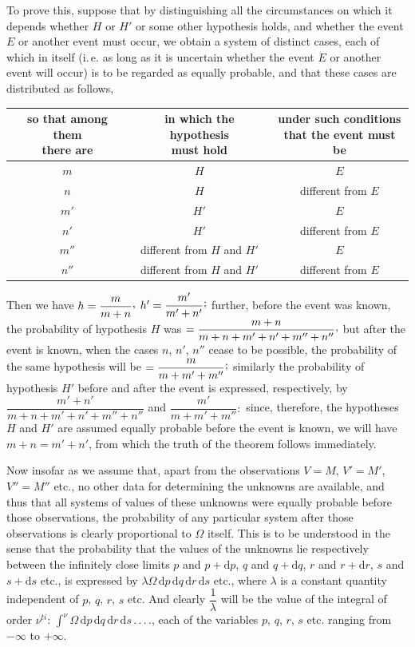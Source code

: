 To prove this, suppose that by distinguishing all the circumstances on which it depends whether $H$ or $H'$ or some other hypothesis holds, and whether the event $E$ or another event must occur, we obtain a system of distinct cases, each of which in itself (i.\,e. as long as it is uncertain whether the event $E$ or another event will occur) is to be regarded as equally probable, and that these cases are distributed as follows,
\begin{center}
\small
\begin{tabular}{c|c|c}
\shortstack{so that among them\\there are} & \shortstack{in which the hypothesis\\must hold} & \shortstack{under such conditions\\that the event must be} \\
\hline
$m$ & $H$ & $E$ \\
$n$ & $H$ & different from $E$ \\
$m'$ & $H'$ & $E$ \\
$n'$ & $H'$ & different from $E$ \\
$m''$ & different from $H$ and $H'$ & $E$ \\
$n''$ & different from $H$ and $H'$ & different from $E$
\end{tabular}
\end{center}
Then we have $h=\dfrac{m}{m+n}\mathpunct{\raisebox{.45ex}{,}}$ $h'=\dfrac{m'}{m'+n'}\mathpunct{\raisebox{.45ex}{;}}$ further, before the event was known, the probability of hypothesis $H$ was $=\dfrac{m+n}{m+n+m'+n'+m''+n''}\mathpunct{\raisebox{.45ex}{,}}$ but after the event is known, when the cases $n$, $n'$, $n''$ cease to be possible, the probability of the same hypothesis will be $=\dfrac{m}{m+m'+m''}\mathpunct{\raisebox{.45ex}{;}}$ similarly the probability of hypothesis $H'$ before and after the event is expressed, respectively, by $\dfrac{m'+n'}{m+n+m'+n'+m''+n''}$ and $\dfrac{m'}{m+m'+m''}\mathpunct{:}$ since, therefore, the hypotheses $H$ and $H'$ are assumed equally probable before the event is known, we will have $m+n=m'+n'$, from which the truth of the theorem follows immediately.

Now insofar as we assume that, apart from the observations $V=M$, $V'=M'$, $V''=M''$ etc., no other data for determining the unknowns are available, and thus that all systems of values of these unknowns were equally probable before those observations, the probability of any particular system after those observations is clearly proportional to $\Omega$ itself. This is to be understood in the sense that the probability that the values of the unknowns lie respectively between the infinitely close limits $p$ and $p+\mathrm{d}p$, $q$ and $q+\mathrm{d}q$, $r$ and $r+\mathrm{d}r$, $s$ and $s+\mathrm{d}s$ etc., is expressed by $\lambda\Omega\,\mathrm{d}p\,\mathrm{d}q\,\mathrm{d}r\,\mathrm{d}s$ etc., where $\lambda$ is a constant quantity independent of $p$, $q$, $r$, $s$ etc. And clearly $\dfrac{1}{\lambda}$ will be the value of the integral of order $\nu^{ti}$: $\int^{\nu}\Omega\,\mathrm{d}p\,\mathrm{d}q\,\mathrm{d}r\,\mathrm{d}s\, .\, .\, .\, .$, each of the variables $p$, $q$, $r$, $s$ etc. ranging from $-\infty$ to $+\infty$.
